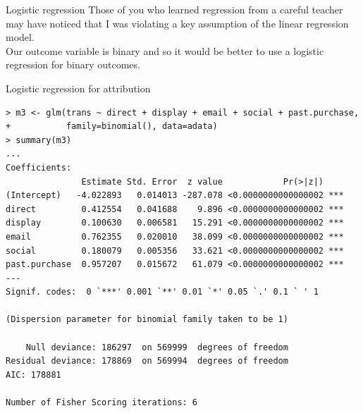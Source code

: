 \documentclass[10pt, aspectratio=169]{beamer}
\begin{document}
\begin{frame}{Logistic regression}
Those of you who learned regression from a careful teacher may have noticed that I was violating a key assumption of the linear regression model. \\
\bigskip \pause
Our outcome variable is binary and so it would be better to use a logistic regression for binary outcomes.
\end{frame}

\begin{frame}[fragile]{Logistic regression for attribution}
\footnotesize
\begin{lstlisting}
> m3 <- glm(trans ~ direct + display + email + social + past.purchase, 
+           family=binomial(), data=adata)
> summary(m3)
...
Coefficients:
               Estimate Std. Error  z value            Pr(>|z|)    
(Intercept)   -4.022893   0.014013 -287.078 <0.0000000000000002 ***
direct         0.412554   0.041688    9.896 <0.0000000000000002 ***
display        0.100630   0.006581   15.291 <0.0000000000000002 ***
email          0.762355   0.020010   38.099 <0.0000000000000002 ***
social         0.180079   0.005356   33.621 <0.0000000000000002 ***
past.purchase  0.957207   0.015672   61.079 <0.0000000000000002 ***
---
Signif. codes:  0 `***' 0.001 `**' 0.01 `*' 0.05 `.' 0.1 ` ' 1

(Dispersion parameter for binomial family taken to be 1)

    Null deviance: 186297  on 569999  degrees of freedom
Residual deviance: 178869  on 569994  degrees of freedom
AIC: 178881

Number of Fisher Scoring iterations: 6
\end{lstlisting}
\end{frame}
\end{document}
